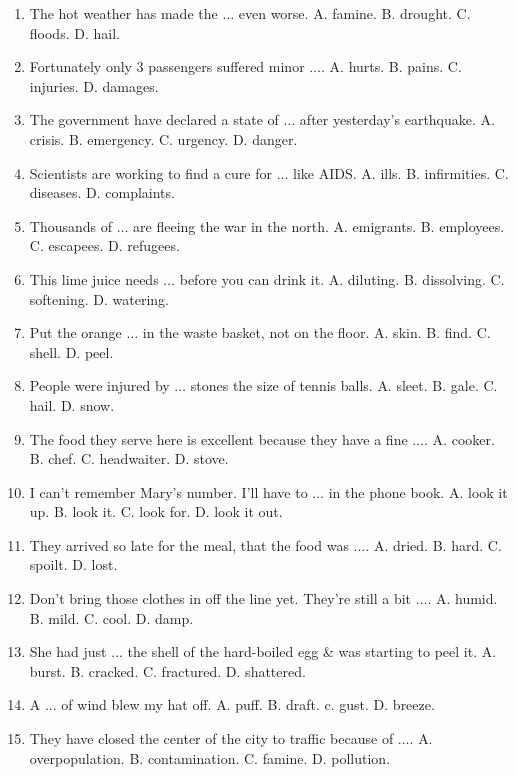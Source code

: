 \documentclass{article}
\numberwithin{equation}{section}
\begin{document}
\begin{enumerate}[leftmargin=8mm]
	\item The hot weather has made the $\ldots$ even worse. {\sf A.} famine. {\sf B.} drought. {\sf C.} floods. {\sf D.} hail.
	\item Fortunately only 3 passengers suffered minor $\ldots$. {\sf A.} hurts. {\sf B.} pains. {\sf C.} injuries. {\sf D.} damages.
	\item The government have declared a state of $\ldots$ after yesterday's earthquake. {\sf A.} crisis. {\sf B.} emergency. {\sf C.} urgency. {\sf D.} danger.
	\item Scientists are working to find a cure for $\ldots$ like AIDS. {\sf A.} ills. {\sf B.} infirmities. {\sf C.} diseases. {\sf D.} complaints.
	\item Thousands of $\ldots$ are fleeing the war in the north. {\sf A.} emigrants. {\sf B.} employees. {\sf C.} escapees. {\sf D.} refugees.
	\item This lime juice needs $\ldots$ before you can drink it. {\sf A.} diluting. {\sf B.} dissolving. {\sf C.} softening. {\sf D.} watering.
	\item Put the orange $\ldots$ in the waste basket, not on the floor. {\sf A.} skin. {\sf B.} find. {\sf C.} shell. {\sf D.} peel.
	\item People were injured by $\ldots$ stones the size of tennis balls. {\sf A.} sleet. {\sf B.} gale. {\sf C.} hail. {\sf D.} snow.
	\item The food they serve here is excellent because they have a fine $\ldots$. {\sf A.} cooker. {\sf B.} chef. {\sf C.} headwaiter. {\sf D.} stove.
	\item I can't remember Mary's number. I'll have to $\ldots$ in the phone book. {\sf A.} look it up. {\sf B.} look it. {\sf C.} look for. {\sf D.} look it out.
	\item They arrived so late for the meal, that the food was $\ldots$. {\sf A.} dried. {\sf B.} hard. {\sf C.} spoilt. {\sf D.} lost.
	\item Don't bring those clothes in off the line yet. They're still a bit $\ldots$. {\sf A.} humid. {\sf B.} mild. {\sf C.} cool. {\sf D.} damp.
	\item She had just $\ldots$ the shell of the hard-boiled egg \& was starting to peel it. {\sf A.} burst. {\sf B.} cracked. {\sf C.} fractured. {\sf D.} shattered.
	\item A $\ldots$ of wind blew my hat off. {\sf A.} puff. {\sf B.} draft. c. gust. {\sf D.} breeze.
	\item They have closed the center of the city to traffic because of $\ldots$. {\sf A.} overpopulation. {\sf B.} contamination. {\sf C.} famine. {\sf D.} pollution.

\end{enumerate}
\end{document}
